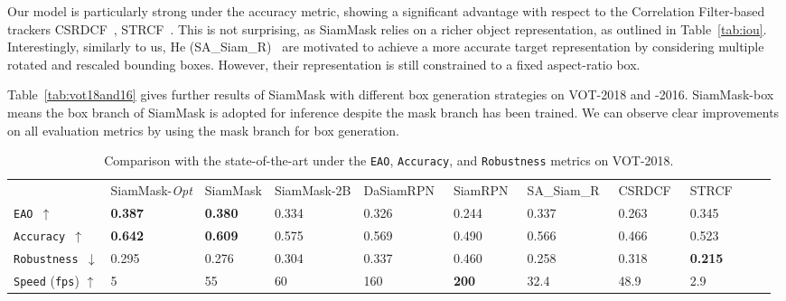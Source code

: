 \documentclass[10pt,twocolumn,letterpaper]{article}
\newcommand{\bd}[1]{\textbf{#1}}
\newcommand{\tablestyle}[2]{\setlength{\tabcolsep}{#1}\renewcommand{\arraystretch}{#2}\centering\footnotesize}
\begin{document}
Our model is particularly strong under the accuracy metric, showing a significant advantage with respect to the Correlation Filter-based trackers CSRDCF~\cite{lukezic2017discriminative}, STRCF~\cite{li2018learning}.
This is not surprising, as SiamMask relies on a richer object representation, as outlined in Table~\ref{tab:iou}.
Interestingly, similarly to us, He \etal (SA\_Siam\_R)~\cite{he2018towards} are motivated to achieve a more accurate target representation by considering multiple rotated and rescaled bounding boxes.
However, their representation is still constrained to a fixed aspect-ratio box.

Table~\ref{tab:vot18and16} gives further results of SiamMask with different box generation strategies on VOT-2018 and -2016.
SiamMask-box means the box branch of SiamMask is adopted for inference despite the mask branch has been trained. We can observe clear improvements on all evaluation metrics by using the mask branch for box generation.


\begin{table*}[t]
\tablestyle{2pt}{1}
\begin{tabular}{l|x{52}x{42}x{48}|x{52}x{52}x{52}x{42}x{42}x{42}x{42}}
& SiamMask-\textit{Opt} & SiamMask & SiamMask-2B & DaSiamRPN~\cite{zhu2018distractor} & SiamRPN~\cite{SiamRPN} & SA\_Siam\_R~\cite{he2018towards}
 &CSRDCF~\cite{lukezic2017discriminative}  &STRCF~\cite{li2018learning} \\
\shline
\texttt{EAO $\uparrow$ }& \bd{0.387} & \bd{0.380} &  0.334 & 0.326 & 0.244 & 0.337 & 0.263  & 0.345 \\
\texttt{Accuracy $\uparrow$}& \bd{0.642} & \bd{0.609} & 0.575 & 0.569 & 0.490 & 0.566 & 0.466  & 0.523 \\
\texttt{Robustness $\downarrow$}& 0.295 & 0.276 &  0.304 & 0.337 &  0.460 & 0.258& 0.318  & \bd{0.215}   \\
\hline
\texttt{Speed} (\texttt{fps}) $\uparrow$ & 5 & 55  & 60  &160   &\bd{200}   &32.4  & 48.9    & 2.9 \\
\end{tabular}
\vspace{1mm}
\caption{Comparison with the state-of-the-art under the \texttt{EAO}, \texttt{Accuracy}, and \texttt{Robustness} metrics on VOT-2018.}
\label{tab:vot18}
\end{table*}
\end{document}
